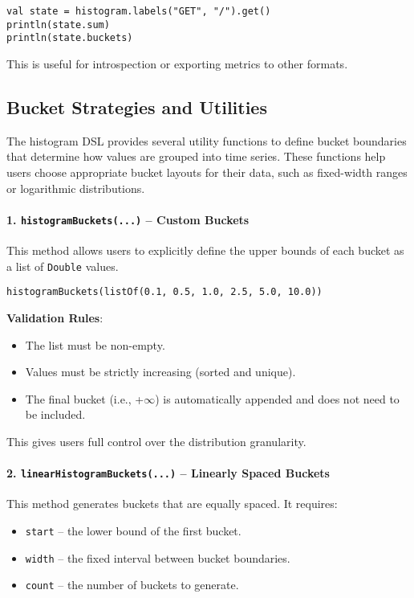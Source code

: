 \begin{verbatim}
val state = histogram.labels("GET", "/").get()
println(state.sum)
println(state.buckets)
\end{verbatim}

This is useful for introspection or exporting metrics to other formats.

\subsection{Bucket Strategies and Utilities}

The histogram DSL provides several utility functions to define bucket boundaries that determine how values are grouped into time series. These functions help users choose appropriate bucket layouts for their data, such as fixed-width ranges or logarithmic distributions.

\paragraph{1. \texttt{histogramBuckets(...)} – Custom Buckets}

This method allows users to explicitly define the upper bounds of each bucket as a list of \texttt{Double} values.

\begin{verbatim}
histogramBuckets(listOf(0.1, 0.5, 1.0, 2.5, 5.0, 10.0))
\end{verbatim}

\textbf{Validation Rules}:
\begin{itemize}
    \item The list must be non-empty.
    \item Values must be strictly increasing (sorted and unique).
    \item The final bucket (i.e., +\(\infty\)) is automatically appended and does not need to be included.
\end{itemize}

This gives users full control over the distribution granularity.

\paragraph{2. \texttt{linearHistogramBuckets(...)} – Linearly Spaced Buckets}

This method generates buckets that are equally spaced. It requires:

\begin{itemize}
    \item \texttt{start} – the lower bound of the first bucket.
    \item \texttt{width} – the fixed interval between bucket boundaries.
    \item \texttt{count} – the number of buckets to generate.
\end{itemize}

